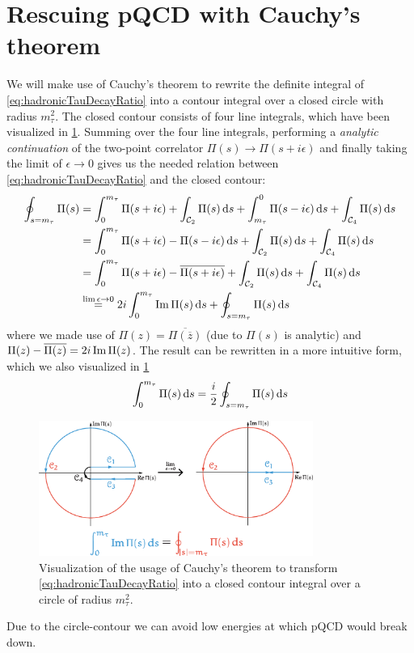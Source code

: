 \documentclass[../../index.tex]{subfiles}
\begin{document}
\section{Rescuing pQCD with Cauchy's theorem}
We will make use of Cauchy's theorem to rewrite the definite integral of
\cref{eq:hadronicTauDecayRatio} into a contour integral over a closed circle
with radius $m_\tau^2$. The closed contour consists of four line integrals,
which have been visualized in \cref{fig:rTauCauchysTheorem}. Summing over the
four line integrals, performing a \textit{analytic continuation} of the
two-point correlator $\Pi(s) \to \Pi(s + i \epsilon)$ and finally taking the
limit of $\epsilon \to 0$ gives us the needed relation between
\cref{eq:hadronicTauDecayRatio} and the closed contour:
\begin{equation}
  \begin{split}
  \oint_{s=m_\tau} \Pi(s) &= \int_0^{m_\tau} \Pi(s + i \epsilon) + \int_{\mathcal{C}_2}\Pi(s) \dif s + \int_{m_\tau}^0 \Pi(s - i \epsilon) \dif s + \int_{\mathcal{C}_4} \Pi(s) \dif s \\
  &= \int_0^{m_\tau} \Pi(s+i \epsilon) - \Pi(s - i \epsilon) \dif s  + \int_{\mathcal{C}_2}\Pi(s) \dif s + \int_{\mathcal{C}_4} \Pi(s) \dif s \\
  &= \int_0^{m_\tau} \Pi(s + i \epsilon) - \overline{\Pi(s + i \epsilon)} + \int_{\mathcal{C}_2}\Pi(s) \dif s + \int_{\mathcal{C}_4} \Pi(s) \dif s \\
  &\overset{\lim \epsilon \to 0}{=} 2 i \int_0^{m_\tau} \Ima \Pi(s) \dif s + \oint_{s=m_\tau} \Pi(s) \dif s
  \end{split}
\end{equation}
where we made use of $\Pi(z) = \overline{\Pi(\overline z)}$ (due to $\Pi(s)$ is analytic) and
$\Pi(z) - \overline{\Pi(z)} = 2 i \operatorname{Im} \Pi(z)$. The result can be rewritten in a
more intuitive form, which we also visualized in \cref{fig:rTauCauchysTheorem}
\begin{equation}
  \label{eq:correlatorContourIntegral}
  \int_0^{m_\tau} \Pi(s) \dif s = \frac{i}{2} \oint_{s=m_\tau} \Pi(s) \dif s
\end{equation}
\begin{figure}
  \centering
  \includegraphics[width=0.8\textwidth]{./images/rTauCauchysTheorem.eps}
  \caption{Visualization of the usage of Cauchy's theorem to transform
    \cref{eq:hadronicTauDecayRatio} into a closed contour integral over a circle
  of radius $m_\tau^2$.}
  \label{fig:rTauCauchysTheorem}
\end{figure}
Due to the circle-contour we can avoid low energies at
which pQCD would break down. 
\end{document}
